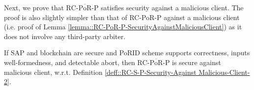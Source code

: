 %  
%     
%     
   

Next, we prove that ${\text{RC-}\overline{\text{PoR}}\text{-P}}$ satisfies security against a malicious client. The proof is also slightly simpler than that  of RC-PoR-P against a malicious client (i.e. proof of Lemma \ref{lemma::RC-PoR-P-SecurityAgainstMaliciousClient}) as it does not involve any third-party arbiter. 


\begin{lemma}
 If SAP and blockchain are secure and  PoRID scheme supports correctness, inputs well-formedness, and detectable abort, then ${\text{RC-}\overline{\text{PoR}}\text{-P}}$ is secure against malicious client, w.r.t. Definition \ref{deff::RC-S-P-Security-Against Malicious-Client-2}. 
\end{lemma}


